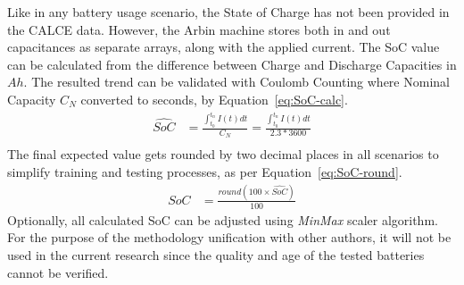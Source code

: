 %
Like in any battery usage scenario, the State of Charge has not been provided in the CALCE data.
However, the Arbin machine stores both in and out capacitances as separate arrays, along with the applied current.
The SoC value can be calculated from the difference between Charge and Discharge Capacities in $Ah$.
The resulted trend can be validated with Coulomb Counting where Nominal Capacity $C_{N}$ converted to seconds, by \mbox{Equation~\ref{eq:SoC-calc}}.
\begin{equation}
    \begin{split}
        \hat{SoC} &= \frac{\int_{t_0}^{t_n} I(t)dt} {C_{N}} = \frac{\int_{t_0}^{t_n} I(t)dt} {2.3*3600} \\
        \label{eq:SoC-calc}
    \end{split}
\end{equation}
The final expected value gets rounded by two decimal places in all scenarios to simplify training and testing processes, as per Equation~\ref{eq:SoC-round}. 
\begin{equation}
    \begin{split}
        SoC &= \frac{round(100\times\hat{SoC})}{100}
        \label{eq:SoC-round}
    \end{split}
\end{equation}
Optionally, all calculated SoC can be adjusted using \textit{MinMax} scaler algorithm.
For the purpose of the methodology unification with other authors, it will not be used in the current research since the quality and age of the tested batteries cannot be verified.

